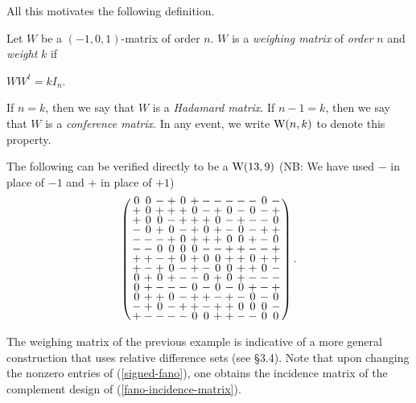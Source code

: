 \documentclass[../../../main]{subfiles}
\begin{document}
 All this motivates the following definition.
 
 \begin{defin}\label{weighing matrix}
  Let $W$ be a $(-1,0,1)$-matrix of order $n$. $W$ is a {\it weighing matrix} of {\it order} $n$ and {\it weight} $k$ if
  \begin{defenum}
   \item $WW^t = kI_n$.
   \end{defenum}
   If $n=k$, then we say that $W$ is a {\it Hadamard matrix}. If $n-1=k$, then we say that $W$ is a {\it conference matrix}. In any event, we write $\text{W}(n,k)$ to denote this property.
 \end{defin}
 
 \begin{ex}\label{weighing example}
  The following can be verified directly to be a $\text{W}(13,9)$ (NB: We have used $-$ in place of $-1$ and $+$ in place of $+1$)
  \begin{equation}\label{signed-fano}
  \arraycolsep=1.25pt\def\arraystretch{0.625}
  \left(\begin{array}{ccccccccccccc}
0&0&-&+&0&+&-&-&-&-&-&0&-\\
+&0&+&+&+&0&-&+&0&-&0&-&+\\
+&0&0&-&+&+&+&0&-&+&-&-&0\\
-&0&+&0&-&+&0&+&-&0&-&+&+\\
-&-&-&+&0&+&+&+&0&0&+&-&0\\
-&-&0&0&0&0&-&-&+&+&-&-&+\\
+&+&-&+&0&+&0&0&+&+&0&+&+\\
+&-&+&0&-&+&-&0&0&+&+&0&-\\
0&+&0&+&-&-&0&+&0&+&-&-&-\\
0&+&-&-&-&0&-&0&-&0&+&-&+\\
0&+&+&0&-&+&+&-&+&-&0&-&0\\
-&+&0&-&+&+&-&+&+&0&0&0&-\\
+&-&-&-&-&0&0&+&+&-&-&0&0\\
  \end{array}\right).
  \end{equation}
 \end{ex}
 
 The weighing matrix of the previous example is indicative of a more general construction that uses relative difference sets (see \S3.4). Note that upon changing the nonzero entries of (\ref{signed-fano}), one obtains the incidence matrix of the complement design of (\ref{fano-incidence-matrix}).
 
\end{document}
